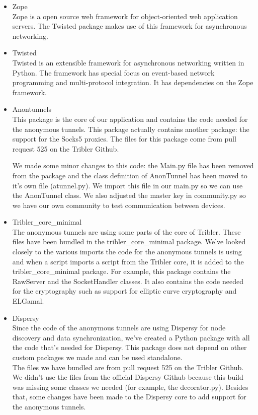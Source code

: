 \begin{itemize}
			\item Zope\\
			Zope is a open source web framework for object-oriented web application servers. The Twisted package makes use of this framework for asynchronous networking.
		
			\item Twisted\\
			Twisted is an extensible framework for asynchronous networking written in Python. The framework has special focus on event-based network programming and multi-protocol integration. It has dependencies on the Zope framework.
		
			\item Anontunnels\\
			This package is the core of our application and contains the code needed for the anonymous tunnels. This package actually contains another package: the support for the Socks5 proxies. The files for this package come from pull request 525 on the Tribler Github.
			
			We made some minor changes to this code: the Main.py file has been removed from the package and the class definition of AnonTunnel has been moved to it’s own file (atunnel.py). We import this file in our main.py so we can use the AnonTunnel class. We also adjusted the master key in community.py so we have our own community to test communication between devices.
			
			\item Tribler\_core\_minimal\\
			The anonymous tunnels are using some parts of the core of Tribler. These files have been bundled in the tribler\_core\_minimal package. We’ve looked closely to the various imports the code for the anonymous tunnels is using and when a script imports a script from the Tribler core, it is added to the tribler\_core\_minimal package. For example, this package contains the RawServer and the SocketHandler classes. It also contains the code needed for the cryptography such as support for elliptic curve cryptography and ELGamal.
			
			\item Dispersy\\
			Since the code of the anonymous tunnels are using Dispersy for node discovery and data synchronization, we’ve created a Python package with all the code that’s needed for Dispersy. This package does not depend on other custom packages we made and can be used standalone.\\
			The files we have bundled are from pull request 525 on the Tribler Github. We didn’t use the files from the official Dispersy Github because this build was missing some classes we needed (for example, the decorator.py). Besides that, some changes have been made to the Dispersy core to add support for the anonymous tunnels.
		
		\end{itemize}
	

